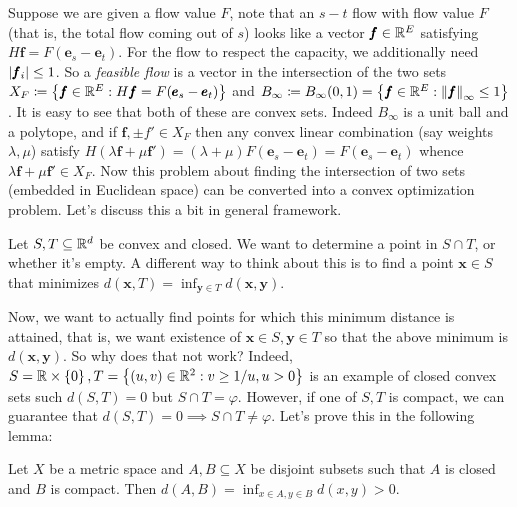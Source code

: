 Suppose we are given a flow value $F$, note that an $s-t$ flow with flow value $F$ (that is, the total flow coming out of $s$) looks like a vector $\pmb f\in \mathbb{R}^E$ satisfying $H\pmb f = F(\pmb e_s-\pmb e_t)$. For the flow to respect the capacity, we additionally need $\left| \pmb f_i \right|\leq 1$. So a \textit{feasible flow} is a vector in the intersection of the two sets $X_F \coloneqq \left\{\pmb f\in \mathbb{R}^E: H\pmb f = F(\pmb e_s-\pmb e_t)\right\}$ and $B_\infty\coloneqq B_\infty(0,1) = \left\{\pmb f\in \mathbb{R}^E: \left\lVert \pmb f \right\rVert_{\infty}\leq 1\right\}$. It is easy to see that both of these are convex sets. Indeed $B_\infty$ is a unit ball and a polytope, and if $\pmb f,\pm f'\in X_F$ then any convex linear combination (say weights $\lambda,\mu$) satisfy $H(\lambda \pmb f+\mu\pmb f') = (\lambda+\mu)F(\pmb e_s-\pmb e_t) = F(\pmb e_s-\pmb e_t)$ whence $\lambda \pmb f+\mu\pmb f'\in X_F$. Now this problem about finding the intersection of two sets (embedded in Euclidean space) can be converted into a convex optimization problem. Let's discuss this a bit in general framework.

Let $S,T\subseteq \mathbb{R}^d$ be convex and closed. We want to determine a point in $S\cap T$, or whether it's empty. A different way to think about this is to find a point $\pmb x\in S$ that minimizes $\displaystyle d(\pmb x,T) = \inf_{\pmb y\in T}d(\pmb x,\pmb y)$. 

Now, we want to actually find points for which this minimum distance is attained, that is, we want existence of $\pmb x\in S,\pmb y\in T$ so that the above minimum is $d(\pmb x,\pmb y)$. So why does that not work? Indeed, $S = \mathbb{R}\times \left\{0\right\}, T = \left\{(u,v)\in \mathbb{R}^2: v\geq 1/u, u>0\right\}$ is an example of closed convex sets such $d(S,T) = 0$ but $S\cap T = \varphi$. However, if one of $S,T$ is compact, we can guarantee that $d(S,T)=0\implies S\cap T \neq \varphi$. Let's prove this in the following lemma:

\begin{lemma}
Let $X$ be a metric space and $A,B\subseteq X$ be disjoint subsets such that $A$ is closed and $B$ is compact. Then $\displaystyle d(A,B) = \inf_{x\in A,y\in B} d(x,y) >0$.
\end{lemma}



